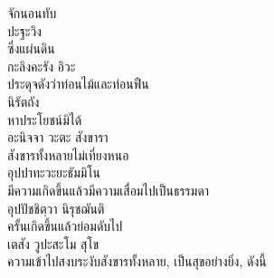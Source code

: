 \documentclass{article}
\begin{document}
\indent จักนอนทับ\\
ปะฐะวิง\\
\indent ซึ่งแผ่นดิน\\
กะลิงคะรัง อิวะ\\
\indent ประดุจดังว่าท่อนไม้และท่อนฟืน\\
นิรัตถัง\\
\indent หาประโยชน์มิได้\\
อะนิจจา วะตะ สังขารา\\
\indent สังขารทั้งหลายไม่เที่ยงหนอ\\
อุปปาทะวะยะธัมมิโน\\
\indent มีความเกิดขึ้นแล้วมีความเสื่อมไปเป็นธรรมดา\\
อุปปัชชิตฺวา นิรุชฌันติ\\
\indent ครั้นเกิดขึ้นแล้วย่อมดับไป\\
เตสัง วูปะสะโม สุโข\\
\indent ความเข้าไปสงบระงับสังขารทั้งหลาย, เป็นสุขอย่างยิ่ง, ดังนี้\\
\end{document}
